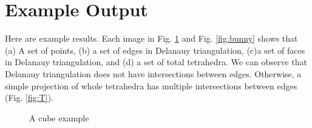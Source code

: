 \documentclass[11pt]{article}
\begin{document}
\section{Example Output}
 Here are example results. Each image in Fig. \ref{fig:cube} and Fig. \ref{fig:bunny} shows that (a) A set of points, (b) a set of edges in Delanauy triangulation, (c)a set of faces in Delanauy triangulation, and (d) a set of total tetrahedra. We can observe that Delanauy triangulation does not have intersections between edges. Otherwise, a simple projection of whole tetrahedra has multiple intersections between edges (Fig. \ref{fig:T}).
\begin{figure}[h]
 \centering
  \hspace{-3mm}
  \hspace{-3mm}
  \hspace{-3mm}
 \hspace{-3mm}
   \caption{A cube example\label{fig:cube}}
\end{figure}
\end{document}

